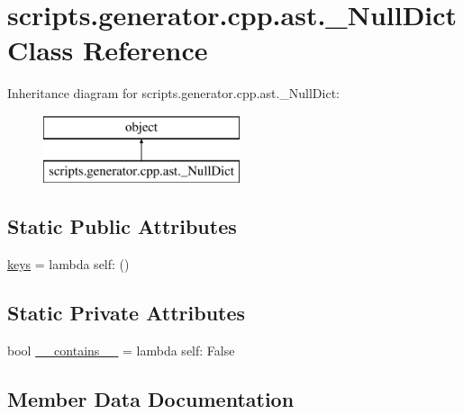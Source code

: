 \hypertarget{classscripts_1_1generator_1_1cpp_1_1ast_1_1___null_dict}{}\section{scripts.\+generator.\+cpp.\+ast.\+\_\+\+Null\+Dict Class Reference}
\label{classscripts_1_1generator_1_1cpp_1_1ast_1_1___null_dict}
Inheritance diagram for scripts.\+generator.\+cpp.\+ast.\+\_\+\+Null\+Dict\+:\begin{figure}[H]
\begin{center}
\leavevmode
\includegraphics[height=2.000000cm]{d4/ddd/classscripts_1_1generator_1_1cpp_1_1ast_1_1___null_dict}
\end{center}
\end{figure}
\subsection*{Static Public Attributes}
\begin{DoxyCompactItemize}
\item 
\mbox{\hyperlink{classscripts_1_1generator_1_1cpp_1_1ast_1_1___null_dict_a2d7272178e7c8454aa854abec29b7a27}{keys}} = lambda self\+: ()
\end{DoxyCompactItemize}
\subsection*{Static Private Attributes}
\begin{DoxyCompactItemize}
\item 
bool \mbox{\hyperlink{classscripts_1_1generator_1_1cpp_1_1ast_1_1___null_dict_a8f5229d5ca66f3ec1cae7837a36c8393}{\+\_\+\+\_\+contains\+\_\+\+\_\+}} = lambda self\+: False
\end{DoxyCompactItemize}


\subsection{Member Data Documentation}
\mbox{\label{classscripts_1_1generator_1_1cpp_1_1ast_1_1___null_dict_a8f5229d5ca66f3ec1cae7837a36c8393}} 
